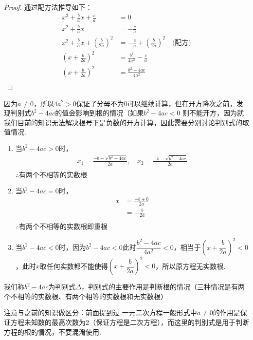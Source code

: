 \documentclass[lang=cn, 10pt, titlestyle=display, oneside]{elegantbook}
\begin{document}
\begin{proof}
通过配方法推导如下：
\begin{align*}
    x^2 + \frac{b}{a}x + \frac{c}{a} &= 0\\
    x^2 + \frac{b}{a}x &= -\frac{c}{a}\\
    x^2 + \frac{b}{a}x + \left(\frac{b}{2a}\right)^2 &= -\frac{c}{a} + \left(\frac{b}{2a}\right)^2 \quad \text{(配方)} \\
    \left(x + \frac{b}{2a}\right)^2 &= \frac{b^2}{4a^2} - \frac{c}{a}\\
    \left(x + \frac{b}{2a}\right)^2 &= \frac{b^2 - 4ac}{4a^2}\\
\end{align*}
\end{proof}
因为\(a\ne0\)，所以\(4a^2>0\)保证了分母不为0可以继续计算，但在开方降次之前，发现判别式\(b^2 - 4ac\)的值会影响到根的情况（如果$b^2 - 4ac<0$ 则不能开方，因为就我们目前的知识无法解决根号下是负数的开方计算，因此需要分别讨论判别式的取值情况.
\begin{enumerate}
    \item 当\(b^2 - 4ac>0\)时，
    \begin{align*}
        x_1 = \frac{-b + \sqrt{b^2 - 4ac}}{2a}, \quad x_2 = \frac{-b - \sqrt{b^2 - 4ac}}{2a}\\
    \end{align*}
    $\therefore \text{有两个不相等的实数根}$
    \item 当\(b^2 - 4ac=0\)时，
    \begin{align*}
         x &= \frac{-b \pm 0}{2a}\\
    &= -\frac{b}{2a}\\
    \end{align*}
    $\therefore \text{有两个不相等的实数根即重根}$
    \item 当\(b^2 - 4ac<0\)时，因为\(b^2 - 4ac<0\)此时\(\dfrac{b^2 - 4ac}{4a^2}<0\)，相当于\((x + \dfrac{b}{2a})^2<0\)，此时\(x\)取任何实数都不能使得\((x + \dfrac{b}{2a})^2<0\)，所以原方程无实数根.

\end{enumerate}
\par
我们称\(b^2 - 4ac\)为判别式\(\Delta\)，判别式的主要作用是判断根的情况（三种情况是有两个不相等的实数根、有两个相等的实数根和无实数根）
\par
\begin{remark}
注意与之前的知识做区分：前面提到过 一元二次方程一般形式中\(a\ne0\)的作用是保证方程未知数的最高次数为2（保证方程是二次方程），而这里的判别式是用于判断方程的根的情况，不要混淆使用. 
\end{remark}
\end{document}
